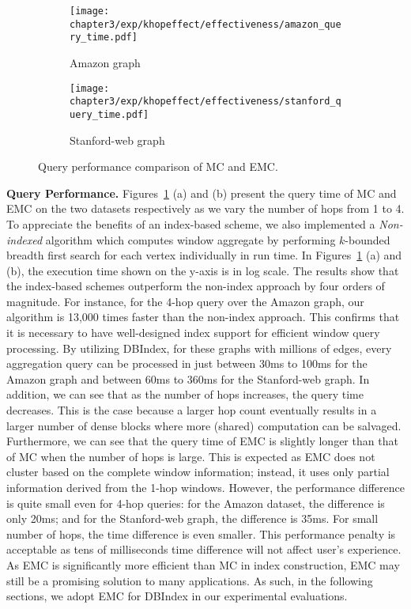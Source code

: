 \begin{figure}[h]
\centering
\begin{subfigure}{0.48\linewidth}
\centering
  \texttt{[image: chapter3/exp/khopeffect/effectiveness/amazon\_query\_time.pdf]}
  \caption{Amazon graph}
\end{subfigure}%
\begin{subfigure}{0.48\linewidth}
\centering
  \texttt{[image: chapter3/exp/khopeffect/effectiveness/stanford\_query\_time.pdf]}
  \caption{Stanford-web graph}
\end{subfigure}
\caption{Query performance comparison of MC and EMC.}
\label{fig:khop_effective_query_time}
\end{figure}

\textbf{Query Performance.}       
Figures~\ref{fig:khop_effective_query_time} (a) and (b)
present the query time of MC and EMC 
on the two datasets respectively 
as we vary the number of hops from 1 to 4.
To appreciate the benefits of an index-based scheme, we also implemented
a \emph{Non-indexed} algorithm which computes window aggregate by performing $k$-bounded breadth
first search for each vertex individually in run time.
In Figures~\ref{fig:khop_effective_query_time} (a) and (b),
the execution time shown on the y-axis is in log scale. The results show that the index-based 
schemes outperform the non-index approach by four orders of magnitude. 
For instance, for the 4-hop query over the Amazon graph, 
our algorithm is 13,000 times faster than the non-index approach. 
This confirms that it is necessary to have well-designed index support 
for efficient window query processing. By utilizing DBIndex, 
for these graphs with millions of edges, every aggregation query 
can be processed in just between 30ms to 100ms for the Amazon graph and 
between 60ms to 360ms for the Stanford-web graph. In addition, we can 
see that as the number of hops increases, the query time decreases. 
This is the case because a larger hop count eventually results in a larger
number of dense blocks where more (shared) computation can be salvaged. 
Furthermore, we can see that the query time of EMC is slightly longer 
than that of MC when the number of hops is large. This is expected as 
EMC does not cluster based on the complete window information; instead, it
uses only partial information derived from the 1-hop windows. 
However, the performance difference is quite small even for 4-hop queries: for
the Amazon dataset, the difference is only 20ms; and for the Stanford-web
graph, the difference is 35ms. 
For small number of hops, the time difference is even smaller. 
This performance penalty is acceptable as tens of milliseconds time 
difference will not affect user's experience.  As EMC is significantly more 
efficient than MC in index construction, EMC may still be a 
promising solution to many applications. As such, 
in the following sections, we adopt EMC for DBIndex in
our experimental evaluations.  
 

